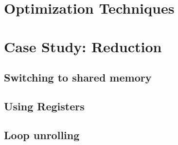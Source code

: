 

\section{Optimization Techniques}


\section{Case Study: Reduction}

\subsection{Switching to shared memory}


\subsection{Using Registers}


\subsection{Loop unrolling}\label{sec:loopUnrolling}











